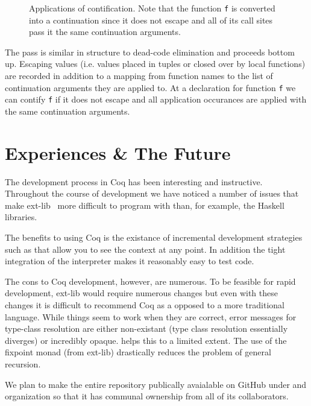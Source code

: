 \documentclass{article}
\begin{document}
\begin{figure}[htb]
\caption{Applications of contification. Note that the function \lstinline!f! is converted into a continuation since it does not escape and all of its call sites pass it the same continuation arguments.}
\label{fig:contification}
\end{figure}

The pass is similar in structure to dead-code elimination and proceeds bottom up. Escaping values (i.e. values placed in tuples or closed over by local functions) are recorded in addition to a mapping from function names to the list of continuation arguments they are applied to. At a declaration for function \lstinline!f! we can contify \lstinline!f! if it does not escape and all application occurances are applied with the same continuation arguments. 

\section*{Experiences \& The Future}
The development process in Coq has been interesting and instructive. Throughout the course of development we have noticed a number of issues that make ext-lib~\cite{coq-ext-lib} more difficult to program with than, for example, the Haskell libraries. 

The benefits to using Coq is the existance of incremental development strategies such as  that allow you to see the context at any point. In addition the tight integration of the interpreter makes it reasonably easy to test code.

The cons to Coq development, however, are numerous. To be feasible for rapid development, ext-lib would require numerous changes but even with these changes it is difficult to recommend Coq as a opposed to a more traditional language. While things seem to work when they are correct, error messages for type-class resolution are either non-existant (type class resolution essentially diverges) or incredibly opaque.  helps this to a limited extent. The use of the fixpoint monad (from ext-lib) drastically reduces the problem of general recursion.


We plan to make the entire repository publically avaialable on GitHub under and organization so that it has communal ownership from all of its collaborators.

\end{document}
